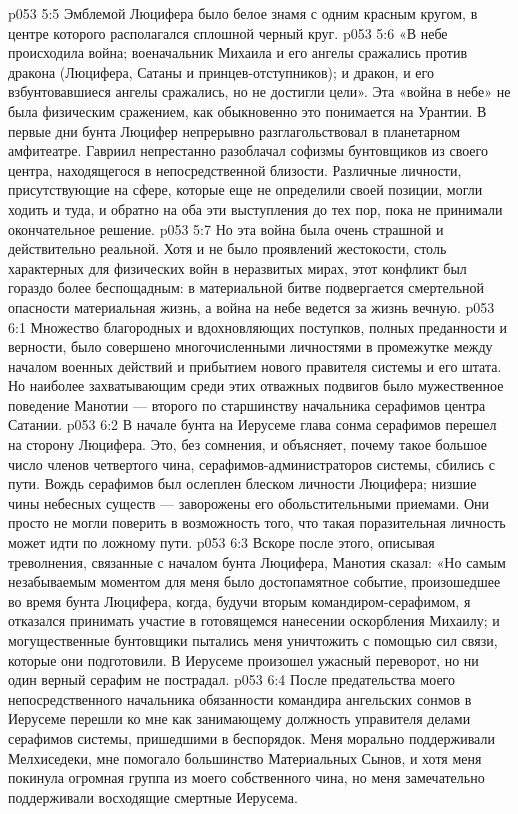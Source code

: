 \vs p053 5:5 Эмблемой Люцифера было белое знамя с одним красным кругом, в центре которого располагался сплошной черный круг.
\vs p053 5:6 «В небе происходила война; военачальник Михаила и его ангелы сражались против дракона (Люцифера, Сатаны и принцев\hyp{}отступников); и дракон, и его взбунтовавшиеся ангелы сражались, но не достигли цели». Эта «война в небе» не была физическим сражением, как обыкновенно это понимается на Урантии. В первые дни бунта Люцифер непрерывно разглагольствовал в планетарном амфитеатре. Гавриил непрестанно разоблачал софизмы бунтовщиков из своего центра, находящегося в непосредственной близости. Различные личности, присутствующие на сфере, которые еще не определили своей позиции, могли ходить и туда, и обратно на оба эти выступления до тех пор, пока не принимали окончательное решение.
\vs p053 5:7 Но эта война была очень страшной и действительно реальной. Хотя и не было проявлений жестокости, столь характерных для физических войн в неразвитых мирах, этот конфликт был гораздо более беспощадным: в материальной битве подвергается смертельной опасности материальная жизнь, а война на небе ведется за жизнь вечную.
\vs p053 6:1 Множество благородных и вдохновляющих поступков, полных преданности и верности, было совершено многочисленными личностями в промежутке между началом военных действий и прибытием нового правителя системы и его штата. Но наиболее захватывающим среди этих отважных подвигов было мужественное поведение Манотии --- второго по старшинству начальника серафимов центра Сатании.
\vs p053 6:2 В начале бунта на Иерусеме глава сонма серафимов перешел на сторону Люцифера. Это, без сомнения, и объясняет, почему такое большое число членов четвертого чина, серафимов\hyp{}администраторов системы, сбились с пути. Вождь серафимов был ослеплен блеском личности Люцифера; низшие чины небесных существ --- заворожены его обольстительными приемами. Они просто не могли поверить в возможность того, что такая поразительная личность может идти по ложному пути.
\vs p053 6:3 \pc Вскоре после этого, описывая треволнения, связанные с началом бунта Люцифера, Манотия сказал: «Но самым незабываемым моментом для меня было достопамятное событие, произошедшее во время бунта Люцифера, когда, будучи вторым командиром\hyp{}серафимом, я отказался принимать участие в готовящемся нанесении оскорбления Михаилу; и могущественные бунтовщики пытались меня уничтожить с помощью сил связи, которые они подготовили. В Иерусеме произошел ужасный переворот, но ни один верный серафим не пострадал.
\vs p053 6:4 После предательства моего непосредственного начальника обязанности командира ангельских сонмов в Иерусеме перешли ко мне как занимающему должность управителя делами серафимов системы, пришедшими в беспорядок. Меня морально поддерживали Мелхиседеки, мне помогало большинство Материальных Сынов, и хотя меня покинула огромная группа из моего собственного чина, но меня замечательно поддерживали восходящие смертные Иерусема.
